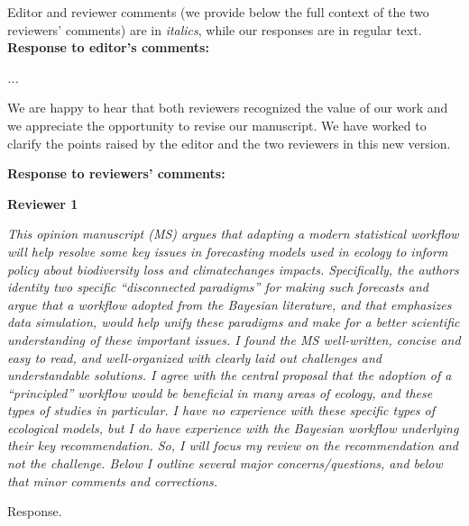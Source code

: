 \documentclass[11pt,letter]{article}
\begin{document}
\setlength{\parindent}{0cm}
\setlength{\parskip}{7pt}

Editor and reviewer comments (we provide below the full context of the two reviewers' comments) are in \emph{italics}, while our responses are in regular text. \\ 

{\bf Response to editor's comments:} 

\begin{mybox}
\emph{...}
\end{mybox}

We are happy to hear that both reviewers recognized the value of our work and we appreciate the opportunity to revise our manuscript. We have worked to clarify the points raised by the editor and the two reviewers in this new version.

{\bf Response to reviewers' comments:} 

{\bf Reviewer 1}

\begin{mybox}
\emph{This opinion manuscript (MS) argues that adapting a modern statistical workflow will help resolve some key issues in forecasting models used in ecology to inform policy about biodiversity loss and climatechanges impacts. Specifically, the authors identity two specific “disconnected paradigms” for making such forecasts and argue that a workflow adopted from the Bayesian literature, and that emphasizes data simulation, would help unify these paradigms and make for a better scientific understanding of these important issues. I found the MS well-written, concise and easy to read, and well-organized with clearly laid out challenges and understandable solutions. I agree with the central proposal that the adoption of a “principled” workflow would be beneficial in many areas of ecology, and these types of studies in particular. I have no experience with these specific types of ecological models, but I do have experience with the Bayesian workflow underlying their key recommendation. So, I will focus my review on the recommendation and not the challenge. Below I outline several major concerns/questions, and below that minor comments and corrections.}
\end{mybox}

Response.
\end{document}
